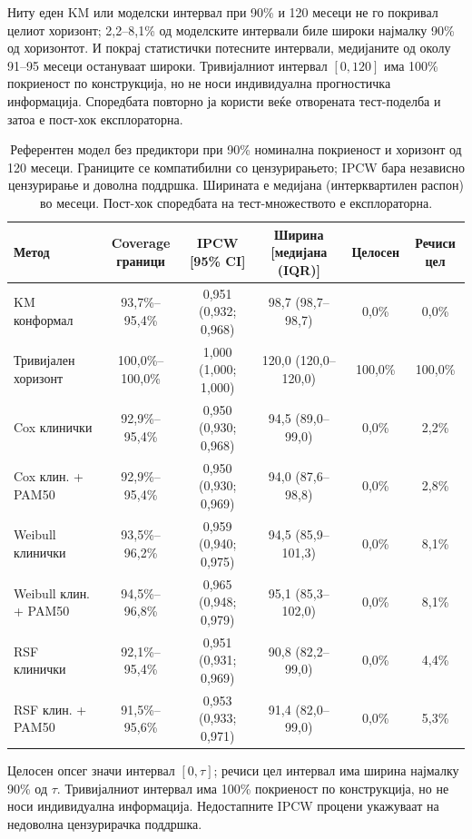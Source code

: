 \documentclass[12pt]{article}
\begin{document}
Ниту еден KM или моделски интервал при 90\% и 120 месеци не го покривал целиот
хоризонт; 2,2--8,1\% од моделските интервали биле широки најмалку 90\% од
хоризонтот. И покрај статистички потесните интервали, медијаните од околу
91--95 месеци остануваат широки. Тривијалниот интервал $[0,120]$ има
100\% покриеност по конструкција, но не носи индивидуална прогностичка
информација. Споредбата повторно ја користи веќе отворената тест-поделба и
затоа е пост-хок експлораторна.

\begin{table}[htbp]
\centering
\small
\setlength{\tabcolsep}{3pt}
\caption{Референтен модел без предиктори при 90\% номинална покриеност и хоризонт од 120 месеци. Границите се компатибилни со цензурирањето; IPCW бара независно цензурирање и доволна поддршка. Ширината е медијана (интерквартилен распон) во месеци. Пост-хок споредбата на тест-множеството е експлораторна.}
\label{tab:predictor-free-baseline}
\begin{tabular}{@{}lccccc@{}}
\toprule
Метод & Coverage граници & IPCW [95\% CI] & Ширина [медијана (IQR)] & Целосен & Речиси цел \\
\midrule
KM конформал & 93,7\%--95,4\% & 0,951 (0,932; 0,968) & 98,7 (98,7--98,7) & 0,0\% & 0,0\% \\
Тривијален хоризонт & 100,0\%--100,0\% & 1,000 (1,000; 1,000) & 120,0 (120,0--120,0) & 100,0\% & 100,0\% \\
Cox клинички & 92,9\%--95,4\% & 0,950 (0,930; 0,968) & 94,5 (89,0--99,0) & 0,0\% & 2,2\% \\
Cox клин. + PAM50 & 92,9\%--95,4\% & 0,950 (0,930; 0,969) & 94,0 (87,6--98,8) & 0,0\% & 2,8\% \\
Weibull клинички & 93,5\%--96,2\% & 0,959 (0,940; 0,975) & 94,5 (85,9--101,3) & 0,0\% & 8,1\% \\
Weibull клин. + PAM50 & 94,5\%--96,8\% & 0,965 (0,948; 0,979) & 95,1 (85,3--102,0) & 0,0\% & 8,1\% \\
RSF клинички & 92,1\%--95,4\% & 0,951 (0,931; 0,969) & 90,8 (82,2--99,0) & 0,0\% & 4,4\% \\
RSF клин. + PAM50 & 91,5\%--95,6\% & 0,953 (0,933; 0,971) & 91,4 (82,0--99,0) & 0,0\% & 5,3\% \\
\bottomrule
\end{tabular}
\begin{minipage}{0.98\linewidth}\footnotesize
Целосен опсег значи интервал $[0,\tau]$; речиси цел интервал има ширина најмалку 90\% од $\tau$. Тривијалниот интервал има 100\% покриеност по конструкција, но не носи индивидуална информација. Недостапните IPCW процени укажуваат на недоволна цензурирачка поддршка.
\end{minipage}
\end{table}
\end{document}
